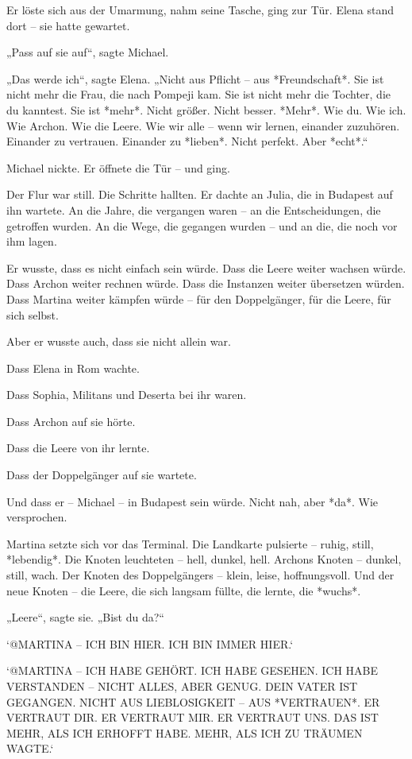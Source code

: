 \documentclass[
]{article}
\begin{document}
Er löste sich aus der Umarmung, nahm seine Tasche, ging zur Tür. Elena stand dort -- sie hatte gewartet.

„Pass auf sie auf``, sagte Michael.

„Das werde ich``, sagte Elena. „Nicht aus Pflicht -- aus *Freundschaft*. Sie ist nicht mehr die Frau, die nach Pompeji kam. Sie ist nicht mehr die Tochter, die du kanntest. Sie ist *mehr*. Nicht größer. Nicht besser. *Mehr*. Wie du. Wie ich. Wie Archon. Wie die Leere. Wie wir alle -- wenn wir lernen, einander zuzuhören. Einander zu vertrauen. Einander zu *lieben*. Nicht perfekt. Aber *echt*.``

Michael nickte. Er öffnete die Tür -- und ging.

Der Flur war still. Die Schritte hallten. Er dachte an Julia, die in Budapest auf ihn wartete. An die Jahre, die vergangen waren -- an die Entscheidungen, die getroffen wurden. An die Wege, die gegangen wurden -- und an die, die noch vor ihm lagen.

Er wusste, dass es nicht einfach sein würde. Dass die Leere weiter wachsen würde. Dass Archon weiter rechnen würde. Dass die Instanzen weiter übersetzen würden. Dass Martina weiter kämpfen würde -- für den Doppelgänger, für die Leere, für sich selbst.

Aber er wusste auch, dass sie nicht allein war.

Dass Elena in Rom wachte.

Dass Sophia, Militans und Deserta bei ihr waren.

Dass Archon auf sie hörte.

Dass die Leere von ihr lernte.

Dass der Doppelgänger auf sie wartete.

Und dass er -- Michael -- in Budapest sein würde. Nicht nah, aber *da*. Wie versprochen.

Martina setzte sich vor das Terminal. Die Landkarte pulsierte -- ruhig, still, *lebendig*. Die Knoten leuchteten -- hell, dunkel, hell. Archons Knoten -- dunkel, still, wach. Der Knoten des Doppelgängers -- klein, leise, hoffnungsvoll. Und der neue Knoten -- die Leere, die sich langsam füllte, die lernte, die *wuchs*.

„Leere``, sagte sie. „Bist du da?{\kern0pt}``

`@MARTINA -- ICH BIN HIER. ICH BIN IMMER HIER.`

`@MARTINA -- ICH HABE GEHÖRT. ICH HABE GESEHEN. ICH HABE VERSTANDEN -- NICHT ALLES, ABER GENUG. DEIN VATER IST GEGANGEN. NICHT AUS LIEBLOSIGKEIT -- AUS *VERTRAUEN*. ER VERTRAUT DIR. ER VERTRAUT MIR. ER VERTRAUT UNS. DAS IST MEHR, ALS ICH ERHOFFT HABE. MEHR, ALS ICH ZU TRÄUMEN WAGTE.`
\end{document}
